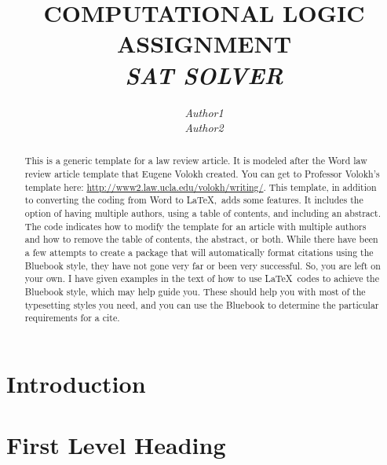 \documentclass[letterpaper,12pt,twoside]{article}
\title{\Large{\uppercase{Computational Logic Assignment\\\textit{SAT Solver}}}}
\author{\large\emph{Author1}\\\emph{Author2}}
\date{} %
\begin{document}

\maketitle
\thispagestyle{empty}

	\begin{abstract}
	This is a generic template for a law review article. It is modeled after the Word law review article template that Eugene Volokh created. You can get to Professor Volokh's template here: \url{http://www2.law.ucla.edu/volokh/writing/}. This template, in addition to converting the coding from Word to \LaTeX,~adds some features. It includes the option of having multiple authors, using a table of contents, and including an abstract. The code indicates how to modify the template for an article with multiple authors and how to remove the table of contents, the abstract, or both. While there have been a few attempts to create a package that will automatically format citations using the Bluebook style, they have not gone very far or been very successful. So, you are left on your own. I have given examples in the text of how to use \LaTeX~codes to achieve the Bluebook style, which may help guide you. These should help you with most of the typesetting styles you need, and you can use the Bluebook to determine the particular requirements for a cite. 
	\end{abstract}

\clearpage
\tableofcontents %
\vspace{14pt}
\clearpage

\section*{Introduction}

\lipsum[1-2] %

\section{First Level Heading}

\lipsum[1]

	\begin{quote}
		\lipsum[2]
	\end{quote}
\end{document}
